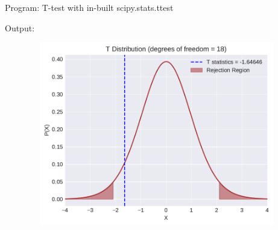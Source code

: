 \documentclass[a4paper,11pt,openright]{report}
\begin{document}
\begin{enumerate}
\pagebreak

\vspace{3cm}

Program: T-test with in-built scipy.stats.ttest


\vspace{2cm}

Output:


\begin{figure}[ht!]
\includegraphics[width=16cm,height=8cm,keepaspectratio]{ttest2.pdf}
\centering
\end{figure}

\end{enumerate}
\end{document}
